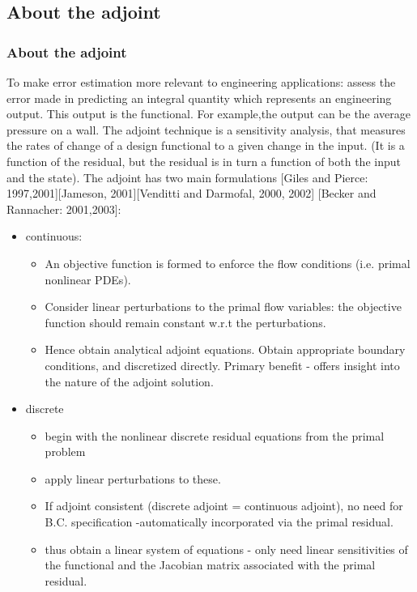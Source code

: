 \documentclass{beamer}
\begin{document}
\subsection[Adjoint]{About the adjoint}
\begin{frame}%
\scriptsize
\frametitle{About the adjoint}
To make error estimation more relevant to engineering applications: assess the error made in predicting an integral quantity which represents an engineering output. This output is the functional. For example,the output can be the average pressure on a wall. 
\newline The adjoint technique is a sensitivity analysis, that measures the rates of change of a design functional to a given change in the input. (It is a function of the residual, but the residual is in turn a function of both the input and the state). \newline
The adjoint has two main formulations [Giles and Pierce: 1997,2001][Jameson, 2001][Venditti and Darmofal, 2000, 2002] [Becker and Rannacher: 2001,2003]:
\begin{itemize}
\item continuous:
\begin{itemize} 
\tiny
\item An objective function is formed to enforce the flow conditions (i.e. primal nonlinear PDEs). 
\item Consider linear perturbations to the primal flow variables: the objective function should remain constant w.r.t the perturbations.
\item Hence obtain analytical adjoint equations. Obtain appropriate boundary conditions, and discretized directly. Primary benefit - offers insight into the nature of the adjoint solution.
\end{itemize}
\item discrete 
\begin{itemize}
\tiny
\item begin with the nonlinear discrete residual equations from the primal problem
\item apply linear perturbations to these. 
\item If adjoint consistent (discrete adjoint = continuous adjoint), no need for B.C. specification -automatically incorporated via the primal residual.   
\item thus obtain a linear system of equations - only need linear sensitivities of the functional and the Jacobian matrix associated with the primal residual.
\end{itemize}
\end{itemize}
\end{frame}
\end{document}
